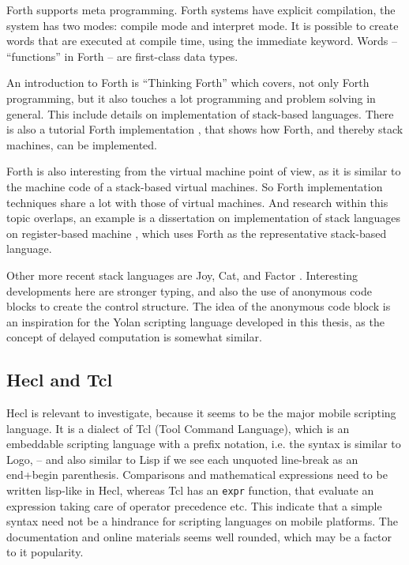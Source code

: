 \documentclass[11pt]{report}
\begin{document}
Forth supports meta programming.
Forth systems have explicit compilation, the system has two modes: compile mode and interpret mode. 
It is possible to create words that are executed at compile time, using the immediate keyword.
Words -- ``functions'' in Forth -- are first-class data types.

An introduction to Forth is
``Thinking Forth'' \cite{thinking-forth} which covers, not only Forth programming, but it also touches a lot programming and problem solving in general. This include details on implementation of stack-based languages.
There is also a tutorial Forth implementation \cite{jonesforth}, that shows how Forth, and thereby stack machines, can be implemented. 

Forth is also interesting from the virtual machine point of view, as it is similar to the machine code of a stack-based virtual machines. So Forth implementation techniques share a lot with those of virtual machines. And research within this topic overlaps, an example is a dissertation on implementation of stack languages on register-based machine \cite{ertl-dissertation}, which uses Forth as the representative stack-based language.

Other more recent stack languages are Joy, Cat, and Factor \cite{factor-language}.
Interesting developments here are stronger typing, and also the use of anonymous code blocks to create the control structure.
The idea of the anonymous code block is an inspiration for the Yolan scripting language developed in this thesis, as the concept of delayed computation is somewhat similar.


\subsection{Hecl and Tcl}
Hecl is relevant to investigate, because it seems to be the major mobile scripting language. 
It is a dialect of Tcl (Tool Command Language), which is an embeddable scripting language \cite{tclbook} with a prefix notation, i.e. the syntax is similar to Logo, -- and also similar to Lisp if we see each unquoted line-break as an end+begin parenthesis.
Comparisons and mathematical expressions need to be written lisp-like in Hecl, whereas Tcl has an \verb|expr| function, that evaluate an expression taking care of operator precedence etc.
This indicate that a simple syntax need not be a hindrance for scripting languages on mobile platforms.
The documentation and online materials seems well rounded, which may be a factor to it popularity.
\end{document}
